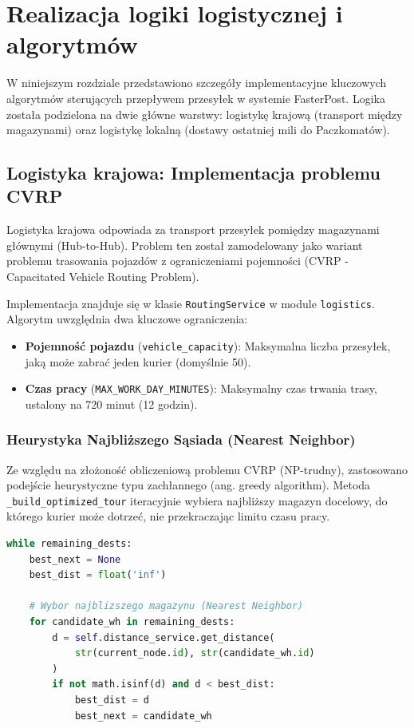 \chapter{Realizacja logiki logistycznej i algorytmów}

W niniejszym rozdziale przedstawiono szczegóły implementacyjne kluczowych algorytmów sterujących przepływem przesyłek w systemie FasterPost. Logika została podzielona na dwie główne warstwy: logistykę krajową (transport między magazynami) oraz logistykę lokalną (dostawy ostatniej mili do Paczkomatów).

\section{Logistyka krajowa: Implementacja problemu CVRP}

Logistyka krajowa odpowiada za transport przesyłek pomiędzy magazynami głównymi (Hub-to-Hub). Problem ten został zamodelowany jako wariant problemu trasowania pojazdów z ograniczeniami pojemności (CVRP - Capacitated Vehicle Routing Problem).

Implementacja znajduje się w klasie \texttt{RoutingService} w module \texttt{logistics}. Algorytm uwzględnia dwa kluczowe ograniczenia:
\begin{itemize}
    \item \textbf{Pojemność pojazdu} (\texttt{vehicle\_capacity}): Maksymalna liczba przesyłek, jaką może zabrać jeden kurier (domyślnie 50).
    \item \textbf{Czas pracy} (\texttt{MAX\_WORK\_DAY\_MINUTES}): Maksymalny czas trwania trasy, ustalony na 720 minut (12 godzin).
\end{itemize}

\subsection{Heurystyka Najbliższego Sąsiada (Nearest Neighbor)}

Ze względu na złożoność obliczeniową problemu CVRP (NP-trudny), zastosowano podejście heurystyczne typu zachłannego (ang. greedy algorithm). Metoda \texttt{\_build\_optimized\_tour} iteracyjnie wybiera najbliższy magazyn docelowy, do którego kurier może dotrzeć, nie przekraczając limitu czasu pracy.

\begin{lstlisting}[language=Python, caption=Fragment algorytmu wyboru kolejnego celu w logistyce krajowej]
while remaining_dests:
    best_next = None
    best_dist = float('inf')
    
    # Wybor najblizszego magazynu (Nearest Neighbor)
    for candidate_wh in remaining_dests:
        d = self.distance_service.get_distance(
            str(current_node.id), str(candidate_wh.id)
        )
        if not math.isinf(d) and d < best_dist:
            best_dist = d
            best_next = candidate_wh
\end{lstlisting}

